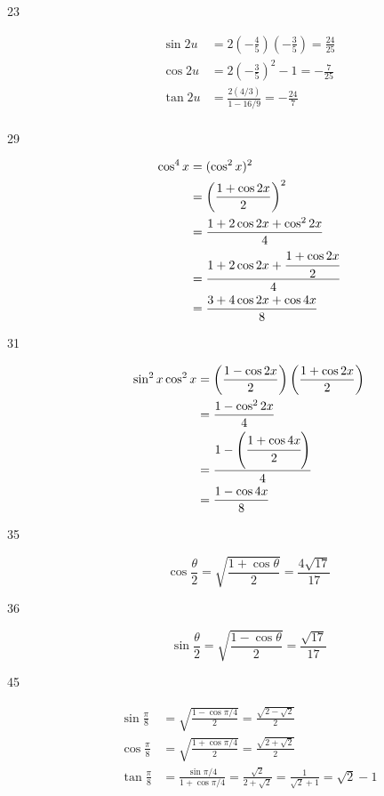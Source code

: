 \documentclass[fleqn,addpoints]{exam}
\begin{document}
\begin{description}
\item[23]
\begin{align*}
  \sin 2u &= 2 \left( - \frac{4}{5} \right) \left( - \frac{3}{5} \right) = \frac{24}{25} \\
  \cos 2u &= 2 \left( - \frac{3}{5} \right)^2 - 1 = - \frac{7}{25} \\
  \tan 2u &= \frac{2 (4/3)}{1 - 16/9} = - \frac{24}{7} \\
\end{align*}

\item[29]
\begin{align*}
  \cos^4 x &= (\cos^2 x)^2 \\
  &= \left( \frac{1 + \cos 2x}{2} \right)^2 \\
  &= \frac{1 + 2 \cos 2x + \cos^2 2x}{4} \\
  &= \cfrac{1 + 2 \cos 2x + \cfrac{1 + \cos 2x}{2}}{4} \\
  &= \frac{3 + 4 \cos 2x + \cos 4x}{8} \\
\end{align*}

\item[31]
\begin{align*}
  \sin^2 x \cos^2 x &= \left( \frac{1 - \cos 2x}{2} \right) \left( \frac{1 + \cos 2x}{2} \right) \\
  &= \frac{1 - \cos^2 2x}{4} \\
  &= \frac{1 - \left( \cfrac{1 + \cos 4x}{2} \right) }{4} \\
  &= \frac{1 - \cos 4x}{8} \\
\end{align*}

\item[35]
\[
  \cos \frac{\theta}{2} = \sqrt{\frac{1 + \cos \theta}{2}} = \frac{4 \sqrt{17}}{17}
\]

\item[36]
\[
  \sin \frac{\theta}{2} = \sqrt{\frac{1 - \cos \theta}{2}} = \frac{\sqrt{17}}{17}
\]

\item[45]
\begin{align*}
  \sin \frac{\pi}{8} &= \sqrt{\frac{1 - \cos \pi/4}{2}} = \frac{\sqrt{2 - \sqrt{2}}}{2} \\
  \cos \frac{\pi}{8} &= \sqrt{\frac{1 + \cos \pi/4}{2}} = \frac{\sqrt{2 + \sqrt{2}}}{2} \\
  \tan \frac{\pi}{8} &= \frac{\sin \pi/4}{1 + \cos \pi/4} = \frac{\sqrt{2}}{2 + \sqrt{2}} = \frac{1}{\sqrt{2} + 1} = \sqrt{2} - 1 \\
\end{align*}


\end{description}
\end{document}
